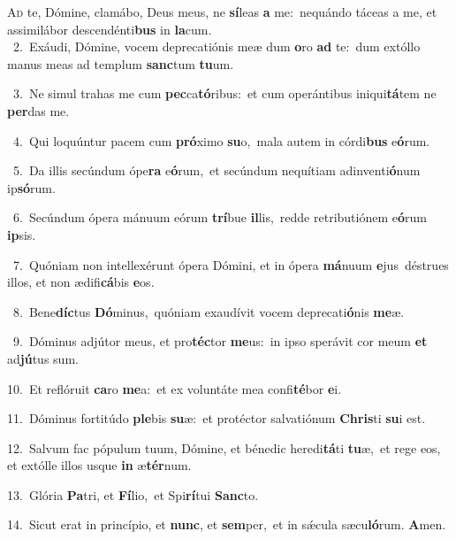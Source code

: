 \lettrine{\initial\textcolor{\initialcolor}{A}}{d} te, Dómine, clamábo, Deus meus, ne \textbf{sí}\-leas \textbf{a} me:~\star nequándo táceas a me, et assimilábor descendénti\textbf{bus} in \textbf{la}\-cum.\\
{\numbfont\textcolor{\numbcolor}{~2.}}~Exáudi, Dómine, vocem deprecatiónis meæ dum \textbf{o}\-ro \textbf{ad} te:~\star dum extóllo manus meas ad templum \textbf{sanc}\-tum \textbf{tu}\-um.\par
{\numbfont\textcolor{\numbcolor}{~3.}}~Ne simul trahas me cum \textbf{pec}\-ca\-\textbf{tó}\-ribus:~\star et cum operántibus iniqui\-\textbf{tá}\-tem ne \textbf{per}\-das me.\par
{\numbfont\textcolor{\numbcolor}{~4.}}~Qui loquúntur pacem cum \textbf{pró}\-ximo \textbf{su}\-o,~\star mala autem in córdi\textbf{bus} e\-\textbf{ó}\-rum.\par
{\numbfont\textcolor{\numbcolor}{~5.}}~Da illis secúndum ópe\textbf{ra} e\-\textbf{ó}\-rum,~\star et secúndum nequítiam adinventi\-\textbf{ó}\-num ip\-\textbf{só}\-rum.\par
{\numbfont\textcolor{\numbcolor}{~6.}}~Secúndum ópera mánuum eórum \textbf{trí}\-bue \textbf{il}\-lis,~\star redde retributiónem e\-\textbf{ó}\-rum \textbf{ip}\-sis.\par
{\numbfont\textcolor{\numbcolor}{~7.}}~Quóniam non intellexérunt ópera Dómini, et in ópera \textbf{má}\-nuum \textbf{e}\-jus~\star déstrues illos, et non ædifi\-\textbf{cá}\-bis \textbf{e}\-os.\par
{\numbfont\textcolor{\numbcolor}{~8.}}~Bene\-\textbf{díc}\-tus \textbf{Dó}\-minus,~\star quóniam exaudívit vocem deprecati\-\textbf{ó}\-nis \textbf{me}\-æ.\par
{\numbfont\textcolor{\numbcolor}{~9.}}~Dóminus adjútor meus, et pro\-\textbf{téc}\-tor \textbf{me}\-us:~\star in ipso sperávit cor meum \textbf{et} ad\-\textbf{jú}\-tus sum.\par
{\numbfont\textcolor{\numbcolor}{10.}}~Et reflóruit \textbf{ca}\-ro \textbf{me}\-a:~\star et ex voluntáte mea confi\-\textbf{té}\-bor \textbf{e}\-i.\par
{\numbfont\textcolor{\numbcolor}{11.}}~Dóminus fortitúdo \textbf{ple}\-bis \textbf{su}\-æ:~\star et protéctor salvatiónum \textbf{Chris}\-ti \textbf{su}\-i est.\par
{\numbfont\textcolor{\numbcolor}{12.}}~Salvum fac pópulum tuum, Dómine, et bénedic heredi\-\textbf{tá}\-ti \textbf{tu}\-æ,~\star et rege eos, et extólle illos usque \textbf{in} æ\-\textbf{tér}\-num.\par
{\numbfont\textcolor{\numbcolor}{13.}}~Glória \textbf{Pa}\-tri, et \textbf{Fí}\-lio,~\star et Spi\-\textbf{rí}\-tui \textbf{Sanc}\-to.\par
{\numbfont\textcolor{\numbcolor}{14.}}~Sicut erat in princípio, et \textbf{nunc}\-, et \textbf{sem}\-per,~\star et in sǽcula sæcu\-\textbf{ló}\-rum. \textbf{A}\-men.\par
